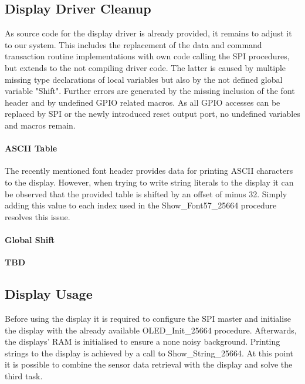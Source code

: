 		\subsection{Display Driver Cleanup} %
		\label{sub:impl_display_driver_cleanup}
			As source code for the display driver is already provided, it remains to adjust it to our system. This includes the replacement of the data and command transaction routine implementations with own code calling the SPI procedures, but extends to the not compiling driver code. The latter is caused by multiple missing type declarations of local variables but also by the not defined global variable "Shift". Further errors are generated by the missing inclusion of the font header and by undefined GPIO related macros. As all GPIO accesses can be replaced by SPI or the newly introduced reset output port, no undefined variables and macros remain.

			\paragraph{ASCII Table} %
			\label{par:ascii_table}
				The recently mentioned font header provides data for printing ASCII characters to the display. However, when trying to write string literals to the display it can be observed that the provided table is shifted by an offset of minus 32. Simply adding this value to each index used in the Show\_Font57\_25664 procedure resolves this issue.

			\paragraph{Global Shift} %
			\label{par:global_shift}
				\textbf{TBD}

		\subsection{Display Usage} %
		\label{sub:display_usage}
			Before using the display it is required to configure the SPI master and initialise the display with the already available OLED\_Init\_25664 procedure. Afterwards, the displays' RAM is initialised to ensure a none noisy background.
			Printing strings to the display is achieved by a call to Show\_String\_25664. At this point it is possible to combine the sensor data retrieval with the display and solve the third task.


